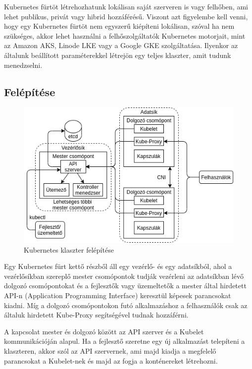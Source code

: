 Kubernetes fürtöt létrehozhatunk lokálisan saját szerveren is vagy felhőben,
ami lehet publikus, privát vagy hibrid hozzáférésű. Viszont azt figyelembe 
kell venni, hogy egy Kubernetes fürtöt nem egyszerű kiépíteni lokálisan, 
szóval ha nem szükséges, akkor lehet használni a felhőszolgáltatók Kubernetes 
motorjait, mint az Amazon AKS, Linode LKE vagy a Google GKE szolgáltatása.
Ilyenkor az általunk beállított paraméterekkel létrejön egy teljes klaszter, amit
tudunk menedzselni.

\subsection{Felépítése}

\begin{figure}[!ht]
	\centering
	\includegraphics[width=1\textwidth, keepaspectratio]{figures/k8s_architecture.png}
	\caption{Kubernetes klaszter felépítése}
	\label{fig:achitecture}
\end{figure}

Egy Kubernetes fürt kettő részből áll egy vezérlő- és egy adatsíkból, ahol a 
vezérlősíkban szereplő mester csomópontok tudják vezérleni az adatsíkban 
lévő dolgozó csomópontokat és a fejlesztők vagy üzemeltetők a mester által
hirdetett API-n (Application Programming Interface) keresztül képesek parancsokat
kiadni. Míg a dolgozó csomópontokon futó alkalmazáshoz a felhasználók csak az 
általuk hirdetett Kube-Proxy segítségével tudnak hozzáférni. 

A kapcsolat mester és dolgozó között az API szerver és a Kubelet kommunikációján
alapul. Ha a fejlesztő szeretne egy új alkalmazást telepíteni a klaszteren, akkor
szól az API szervernek, ami majd kiadja a megfelelő parancsokat a Kubelet-nek 
és majd az fogja a konténereket létrehozni.

